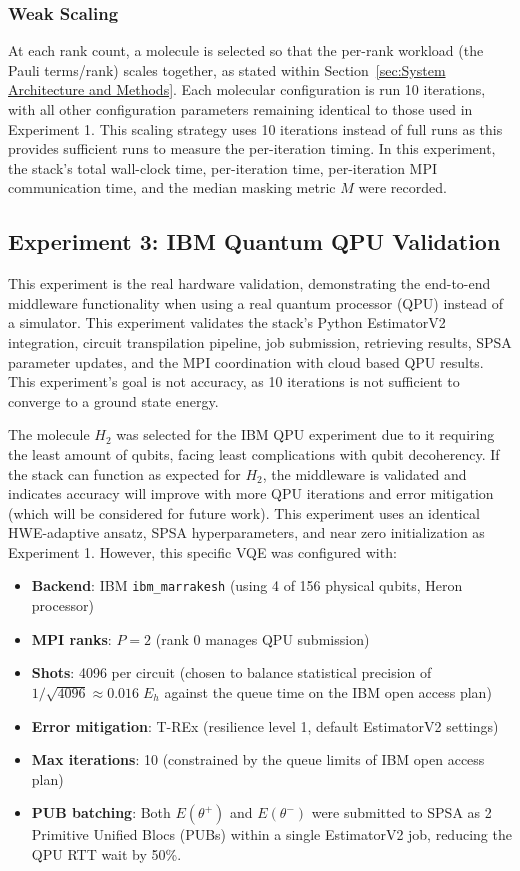 \subsubsection{Weak Scaling}
At each rank count, a molecule is selected so that the per-rank workload (the Pauli terms/rank) scales together, as stated within Section~\ref{sec:System Architecture and Methods}.   
Each molecular configuration is run 10 iterations, with all other configuration parameters remaining identical to those used 
in Experiment 1. This scaling strategy uses 10 iterations instead of full runs as this provides sufficient runs to measure the per-iteration timing. 
In this experiment, the stack's total wall-clock time, per-iteration time, per-iteration MPI communication time, and the median masking metric $M$ were recorded. 

\subsection{Experiment 3: IBM Quantum QPU Validation}   
This experiment is the real hardware validation, demonstrating the end-to-end middleware functionality when using a real quantum 
processor (QPU) instead of a simulator. This experiment validates the stack's Python EstimatorV2 integration, circuit transpilation pipeline, job submission, retrieving results, SPSA parameter updates,  
and the MPI coordination with cloud based QPU results. This experiment's goal is not accuracy, as 10 iterations is not sufficient to converge to a ground state energy. 

The molecule $H_{2}$ was selected for the IBM QPU experiment due to it requiring the least amount of qubits,
facing least complications with qubit decoherency. If the stack can function as expected for $H_2$, the 
middleware is validated and indicates accuracy will improve with more QPU iterations and error mitigation (which will be considered for future work).
This experiment uses an identical HWE-adaptive ansatz, SPSA hyperparameters, 
and near zero initialization as Experiment 1. However, this specific VQE was configured with:
\begin{itemize}
    \item \textbf{Backend}: IBM \texttt{ibm\_marrakesh} (using 4 of 156 physical qubits, Heron processor)\parencite{rallis2025interfacingquantumcomputingsystems}
    \item \textbf{MPI ranks}: $P=2$ (rank 0 manages QPU submission)
    \item \textbf{Shots}: 4096 per circuit (chosen to balance statistical precision of $1/\sqrt{4096} \approx 0.016\;E_h$ against the queue time on the IBM open access plan)
    \item \textbf{Error mitigation}: T-REx (resilience level 1, default EstimatorV2 settings)\parencite{cai2023quantumerrormitigation}
    \item \textbf{Max iterations}: 10 (constrained by the queue limits of IBM open access plan)
    \item \textbf{PUB batching}: Both $E(\theta^+)$ and $E(\theta^-)$ were submitted to SPSA as 2 Primitive Unified Blocs (PUBs) within a single EstimatorV2 job, reducing the QPU RTT wait by 50\%. 
\end{itemize}

